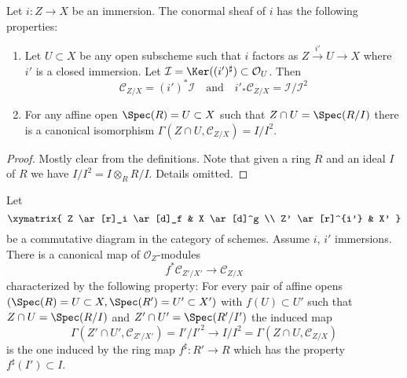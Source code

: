 \begin{lemma}
\label{lemma-affine-conormal}
Let $i : Z \to X$ be an immersion. The conormal sheaf
of $i$ has the following properties:
\begin{enumerate}
\item Let $U \subset X$ be any open subscheme such that $i$
factors as $Z \xrightarrow{i'} U \to X$ where $i'$ is a closed
immersion. Let $\mathcal{I} = \Ker((i')^\sharp) \subset \mathcal{O}_U$.
Then
$$
\mathcal{C}_{Z/X} = (i')^*\mathcal{I}\quad\text{and}\quad
i'_*\mathcal{C}_{Z/X} = \mathcal{I}/\mathcal{I}^2
$$
\item
For any affine open $\Spec(R) = U \subset X$
such that $Z \cap U = \Spec(R/I)$ there is a
canonical isomorphism
$\Gamma(Z \cap U, \mathcal{C}_{Z/X}) = I/I^2$.
\end{enumerate}
\end{lemma}

\begin{proof}
Mostly clear from the definitions. Note that given a ring $R$ and
an ideal $I$ of $R$ we have $I/I^2 = I \otimes_R R/I$. Details omitted.
\end{proof}

\begin{lemma}
\label{lemma-conormal-functorial}
Let
$$
\xymatrix{
Z \ar[r]_i \ar[d]_f & X \ar[d]^g \\
Z' \ar[r]^{i'} & X'
}
$$
be a commutative diagram in the category of schemes.
Assume $i$, $i'$ immersions. There is a canonical map
of $\mathcal{O}_Z$-modules
$$
f^*\mathcal{C}_{Z'/X'}
\longrightarrow
\mathcal{C}_{Z/X}
$$
characterized by the following property: For every pair of affine opens
$(\Spec(R) = U \subset X, \Spec(R') = U' \subset X')$ with
$f(U) \subset U'$ such that
$Z \cap U = \Spec(R/I)$ and $Z' \cap U' = \Spec(R'/I')$
the induced map
$$
\Gamma(Z' \cap U', \mathcal{C}_{Z'/X'}) = I'/I'^2
\longrightarrow
I/I^2 = \Gamma(Z \cap U, \mathcal{C}_{Z/X})
$$
is the one induced by the ring map $f^\sharp : R' \to R$ which
has the property $f^\sharp(I') \subset I$.
\end{lemma}

